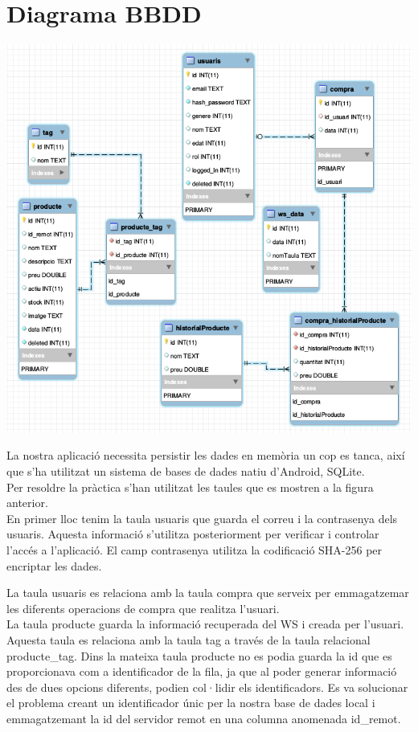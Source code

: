\documentclass{article}[]
\begin{document}
\section{Diagrama BBDD}
\begin{center}
	\includegraphics[scale=0.5]{img/Android_DB_Schema.png}
\end{center}
La nostra aplicació necessita persistir les dades en memòria un cop es tanca, així que s'ha utilitzat un sistema de bases de dades natiu d'Android, SQLite.\\

Per resoldre la pràctica s'han utilitzat les taules que es mostren a la figura anterior.\\

En primer lloc tenim la taula usuaris que guarda el correu i la contrasenya dels usuaris. Aquesta informació s'utilitza posteriorment per verificar i controlar l'accés a l'aplicació. El camp contrasenya utilitza la codificació SHA-256 per encriptar les dades.\\

\newpage

La taula usuaris es relaciona amb la taula compra que serveix per emmagatzemar les diferents operacions de compra que realitza l'usuari.\\

La taula producte guarda la informació recuperada del WS i creada per l'usuari. Aquesta taula es relaciona amb la taula tag a través de la taula relacional producte{\_}tag. Dins la mateixa taula producte no es podia guarda la id que es proporcionava com a identificador de la fila, ja que al poder generar informació des de dues opcions diferents, podien col·lidir els identificadors. Es va solucionar el problema creant un identificador únic per la nostra base de dades local i emmagatzemant la id del servidor remot en una columna anomenada id{\_}remot.
\end{document}
